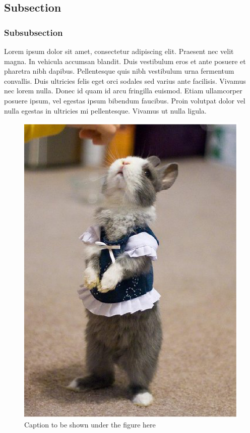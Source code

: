 \subsection{Subsection}
\label{sec:fakesubsec}

\subsubsection*{Subsubsection}
Lorem ipsum dolor sit amet, consectetur adipiscing elit. Praesent nec velit magna. In vehicula accumsan blandit. Duis vestibulum eros et ante posuere et pharetra nibh dapibus. Pellentesque quis nibh vestibulum urna fermentum convallis. Duis ultricies felis eget orci sodales sed varius ante facilisis. Vivamus nec lorem nulla. Donec id quam id arcu fringilla euismod. Etiam ullamcorper posuere ipsum, vel egestas ipsum bibendum faucibus. Proin volutpat dolor vel nulla egestas in ultricies mi pellentesque. Vivamus ut nulla ligula.

\begin{figure}[!hbtp]
\begin{center}
\capstart  %
\includegraphics[height=\linewidth, angle=0]{chapter1/figures/bunny.ps}
\caption[Caption for `list of figures' page here]{Caption to be shown under the figure here}
\label{fig:fakefigure}
\end{center}
\end{figure}

